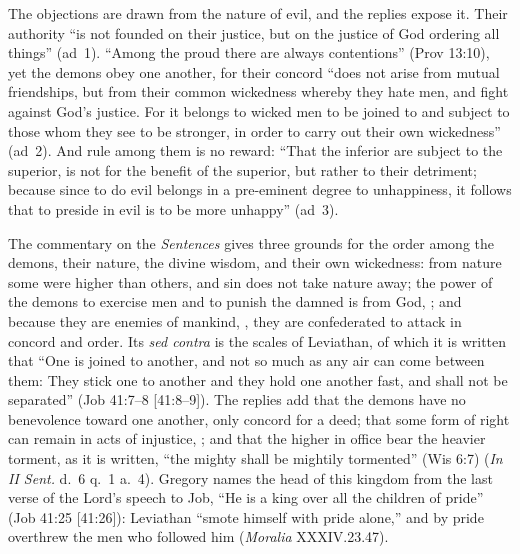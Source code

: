 The objections are drawn from the nature of evil, and the replies expose it.
Their authority ``is not founded on their justice, but on the justice of God
ordering all things'' (ad~1). ``Among the proud there are always
contentions'' (Prov 13:10), yet the demons obey one another, for their
concord ``does not arise from mutual friendships, but from their common
wickedness whereby they hate men, and fight against God's justice. For it
belongs to wicked men to be joined to and subject to those whom they see to be
stronger, in order to carry out their own wickedness'' (ad~2). And rule among
them is no reward: ``That the inferior are subject to the superior, is not
for the benefit of the superior, but rather to their detriment; because since
to do evil belongs in a pre-eminent degree to unhappiness, it follows that to
preside in evil is to be more unhappy'' (ad~3).

The commentary on the \emph{Sentences} gives three grounds for the order
among the demons, their nature, the divine wisdom, and their own wickedness:
from nature some were higher than others, and sin does not take nature away;
the power of the demons to exercise men and to punish the damned is from God,
; and because
they are enemies of mankind, , they are confederated to attack in concord and order. Its
\emph{sed contra} is the scales of Leviathan, of which it is written that
``One is joined to another, and not so much as any air can come between
them: They stick one to another and they hold one another fast, and shall
not be separated'' (Job 41:7--8 [41:8--9]). The replies add that the demons have no
benevolence toward one another, only concord for a deed; that some form of
right can remain in acts of injustice, ; and that the higher in office bear the heavier
torment, as it is written, ``the mighty shall be mightily tormented'' (Wis
6:7) (\emph{In II Sent.} d.~6 q.~1 a.~4). Gregory names the head of this
kingdom from the last verse of the Lord's speech to Job, ``He is a king over
all the children of pride'' (Job 41:25 [41:26]): Leviathan ``smote himself
with pride alone,'' and by pride overthrew the men who followed him
(\emph{Moralia} XXXIV.23.47).

